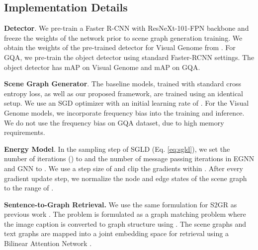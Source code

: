 \documentclass[final]{cvpr}
\begin{document}
\subsection{Implementation Details}
\noindent
\textbf{Detector}. We pre-train a Faster R-CNN \cite{ren2015faster} with ResNeXt-101-FPN \cite{massa2018mrcnn, xie2017aggregated} backbone and freeze the weights of the network prior to scene graph generation training. 
We obtain the weights of the pre-trained detector for Visual Genome from \cite{tang2020sggcode}. For GQA, we pre-train the object detector using standard Faster-RCNN settings. The object detector has  mAP on Visual Genome and  mAP on GQA.

\vspace{0.06in}
\noindent
\textbf{Scene Graph Generator}. 
The baseline models, trained with standard cross entropy loss, as well as our proposed framework, are trained using an identical setup. We use an SGD optimizer with an initial learning rate of . For the Visual Genome models, we incorporate frequency bias \cite{zellers2018neural} into the training and inference.  We do not use the frequency bias on GQA dataset, due to  high memory requirements. 

\vspace{0.06in}
\noindent
\textbf{Energy Model}. In the sampling step of SGLD (Eq. \ref{eq:sgld}), we set the number of iterations () to  and the number of message passing iterations in EGNN and GNN to . We use a step size of  and clip the gradients within . After every gradient update step, we normalize the node and edge states of the scene graph to the range of .

\vspace{0.06in}
\noindent
\textbf{Sentence-to-Graph Retrieval.} We use the same formulation for S2GR as previous work \cite{tang2020unbiased}. The problem is formulated as a graph matching problem where the image caption is converted to graph structure using \cite{krishna2017visual}. The scene graphs and text graphs are mapped into a joint embedding space for retrieval using a Bilinear Attention Network \cite{kim2018bilinear}. 
\end{document}
